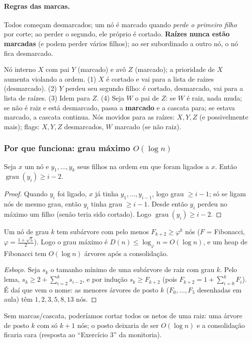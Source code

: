 \paragraph{Regras das marcas.} Todos começam desmarcados; um nó é marcado quando \emph{perde o primeiro filho} por corte; ao perder o segundo, ele próprio é cortado. \textbf{Raízes nunca estão marcadas} (e podem perder vários filhos); ao ser subordinado a outro nó, o nó fica desmarcado.

\begin{exemplo}
Nó interno $X$ com pai $Y$ (marcado) e avô $Z$ (marcado); a prioridade de $X$ aumenta violando a ordem. (1) $X$ é cortado e vai para a lista de raízes (desmarcado). (2) $Y$ perdeu seu segundo filho: é cortado, desmarcado, vai para a lista de raízes. (3) Idem para $Z$. (4) Seja $W$ o pai de $Z$: se $W$ é raiz, nada muda; se não é raiz e está desmarcado, passa a \textbf{marcado} e a cascata para; se estava marcado, a cascata continua. Nós movidos para as raízes: $X,Y,Z$ (e possivelmente mais); flags: $X,Y,Z$ desmarcados, $W$ marcado (se não raiz).
\end{exemplo}

\subsubsection{Por que funciona: grau máximo $O(\log n)$}
\begin{lema}
Seja $x$ um nó e $y_1,\dots,y_k$ seus filhos na ordem em que foram ligados a $x$. Então $\operatorname{grau}(y_i)\ge i-2$.
\end{lema}
\begin{proof}
Quando $y_i$ foi ligado, $x$ já tinha $y_1,\dots,y_{i-1}$, logo grau $\ge i-1$; só se ligam nós de mesmo grau, então $y_i$ tinha grau $\ge i-1$. Desde então $y_i$ perdeu no máximo um filho (senão teria sido cortado). Logo $\operatorname{grau}(y_i)\ge i-2$.
\end{proof}
\begin{teo}
Um nó de grau $k$ tem subárvore com pelo menos $F_{k+2}\ge\varphi^k$ nós ($F$ = Fibonacci, $\varphi=\frac{1+\sqrt5}2$). Logo o grau máximo é $D(n)\le\log_\varphi n=O(\log n)$, e um heap de Fibonacci tem $O(\log n)$ árvores após a consolidação.
\end{teo}
\begin{proof}[Esboço]
Seja $s_k$ o tamanho mínimo de uma subárvore de raiz com grau $k$. Pelo lema, $s_k\ge 2+\sum_{i=2}^{k}s_{i-2}$, e por indução $s_k\ge F_{k+2}$ (pois $F_{k+2}=1+\sum_{i=0}^{k}F_i$). É daí que vem o nome: as menores árvores de posto $k$ ($F_0,\dots,F_5$ desenhadas em aula) têm $1,2,3,5,8,13$ nós.
\end{proof}
\noindent Sem marcas/cascata, poderíamos cortar todos os netos de uma raiz: uma árvore de posto $k$ com só $k+1$ nós; o posto deixaria de ser $O(\log n)$ e a consolidação ficaria cara (resposta ao ``Exercício 3'' da monitoria).

